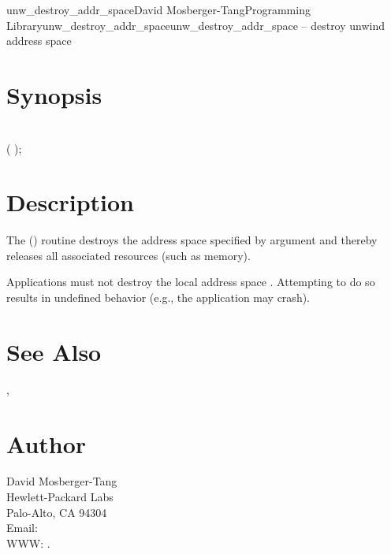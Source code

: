 \documentclass{article}
\begin{document}
\begin{Name}{3}{unw\_destroy\_addr\_space}{David Mosberger-Tang}{Programming Library}{unw\_destroy\_addr\_space}unw\_destroy\_addr\_space -- destroy unwind address space
\end{Name}

\section{Synopsis}

\\

 ( );\\

\section{Description}

The () routine destroys the
address space specified by argument  and thereby releases
all associated resources (such as memory).

Applications must not destroy the local address space
.  Attempting to do so results in
undefined behavior (e.g., the application may crash).

\section{See Also}

,

\section{Author}

\noindent
David Mosberger-Tang\\
Hewlett-Packard Labs\\
Palo-Alto, CA 94304\\
Email: \\
WWW: .
\LatexManEnd
\end{document}
